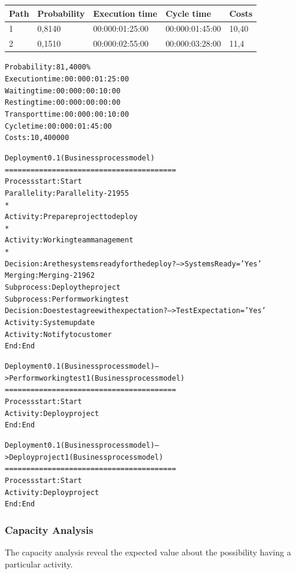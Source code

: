 \begin{table}
\centering
\begin{tabular}{|l|l|l|l|l|}
Path&Probability&Execution time&Cycle time&Costs\\
\hline
1&0,8140&00:000:01:25:00&00:000:01:45:00&10,40\\
\hline
2&0,1510&00:000:02:55:00&00:000:03:28:00&11,4
\end{tabular}
\end{table}

\begin{alltt}
Probability:   81,4000\%
Execution time:  00:000:01:25:00
Waiting time:  00:000:00:10:00
Resting time:  00:000:00:00:00
Transport time:  00:000:00:10:00
Cycle time:  00:000:01:45:00
Costs:  10,400000

Deployment 0.1 (Business process model)
========================================
Process start: Start
Parallelity: Parallelity-21955
    *
    Activity: Prepare project to deploy
    *
    Activity: Working team management
    *
    Decision: Are the systems ready for the deploy? --> SystemsReady='Yes'
Merging: Merging-21962
Subprocess: Deploy the project
Subprocess: Perform working test
Decision: Does test agree with expectation? --> TestExpectation='Yes'
Activity: System update
Activity: Notify to customer
End: End

Deployment 0.1 (Business process model) --> Perform working test 1 (Business process model)
========================================
Process start: Start
Activity: Deploy project
End: End

Deployment 0.1 (Business process model) --> Deploy project 1 (Business process model)
========================================
Process start: Start
Activity: Deploy project
End: End
\end{alltt}


\subsubsection{Capacity Analysis}
The capacity analysis reveal the expected value about the possibility having a particular activity.

